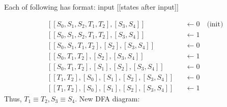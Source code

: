 Each of following has format: input [[states after input]]\\
\begin{minipage}{\linewidth}
\setlength{\abovedisplayskip}{4pt}
\setlength{\belowdisplayskip}{4pt}
  \centering
\begin{align*}
& [[S_{0},S_{1},S_{2},T_{1},T_{2}],[S_{3},S_{4}]] && \leftarrow 0\quad \text{(init)}\\
& [[S_{0},S_{1},S_{2},T_{1},T_{2}],[S_{3},S_{4}]] && \leftarrow 1\\
& [[S_{0},S_{1},T_{1},T_{2}],[S_{2}],[S_{3},S_{4}]] && \leftarrow 0\\
& [[S_{0},T_{1},T_{2}],[S_{2}],[S_{3},S_{4}]] &&  \leftarrow 1\\
& [[S_{0},T_{1},T_{2}],[S_{1}],[S_{2}],[S_{3},S_{4}]] && \leftarrow 0\\
& [[T_{1},T_{2}],[S_{0}],[S_{1}],[S_{2}],[S_{3},S_{4}]] && \leftarrow 0\\
& [[T_{1},T_{2}],[S_{0}],[S_{1}],[S_{2}],[S_{3},S_{4}]] && \leftarrow 1
\end{align*}
Thus, \(T_{1} \equiv T_{2}, S_{3} \equiv S_{4}\). New DFA diagram:
\end{minipage}

